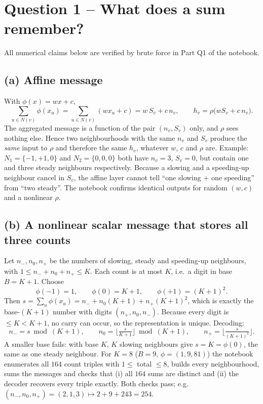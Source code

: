 \section{Question 1 -- What does a sum remember?}
All numerical claims below are verified by brute force in Part Q1 of the notebook.

\subsection*{(a) Affine message}
With $\phi(x)=wx+c$,
\[
  \sum_{u\in N(v)}\phi(x_u)=\sum_{u\in N(v)}(wx_u+c)=w\,S_v+c\,n_v ,
  \qquad h_v=\rho\big(wS_v+c\,n_v\big).
\]
The aggregated message is a function of the pair $(n_v,S_v)$ only, and $\rho$ sees nothing else. Hence two
neighbourhoods with the same $n_v$ and $S_v$ produce the \emph{same} input to $\rho$ and therefore the same
$h_v$, whatever $w$, $c$ and $\rho$ are. Example: $N_1=\{-1,+1,0\}$ and $N_2=\{0,0,0\}$ both have
$n_v=3$, $S_v=0$, but contain one and three steady neighbours respectively. Because a slowing and a speeding-up
neighbour cancel in $S_v$, the affine layer cannot tell ``one slowing + one speeding'' from ``two steady''. The
notebook confirms identical outputs for random $(w,c)$ and a nonlinear $\rho$.

\subsection*{(b) A nonlinear scalar message that stores all three counts}
Let $n_-,n_0,n_+$ be the numbers of slowing, steady and speeding-up neighbours, with
$1\le n_-+n_0+n_+\le K$. Each count is at most $K$, i.e.\ a digit in base $B=K+1$. Choose
\[
  \phi(-1)=1,\qquad \phi(0)=K+1,\qquad \phi(+1)=(K+1)^2 .
\]
Then $s=\sum_{u}\phi(x_u)=n_-+n_0(K+1)+n_+(K+1)^2$, which is exactly the base-$(K+1)$ number with digits
$(n_+,n_0,n_-)$. Because every digit is $\le K<K+1$, no carry can occur, so the representation is unique.
Decoding:
\[
  n_-=s \bmod (K+1),\qquad n_0=\Big\lfloor \tfrac{s}{K+1}\Big\rfloor \bmod (K+1),\qquad
  n_+=\Big\lfloor \tfrac{s}{(K+1)^2}\Big\rfloor .
\]
A smaller base fails: with base $K$, $K$ slowing neighbours give $s=K=\phi(0)$, the same as one steady neighbour.
For $K=8$ ($B=9$, $\phi=(1,9,81)$) the notebook enumerates all $164$ count triples with $1\le$ total $\le 8$, builds
every neighbourhood, sums the messages and checks that (i) all $164$ sums are distinct and (ii) the decoder
recovers every triple exactly. Both checks pass; e.g.\ $(n_-,n_0,n_+)=(2,1,3)\mapsto 2+9+243=254$.

